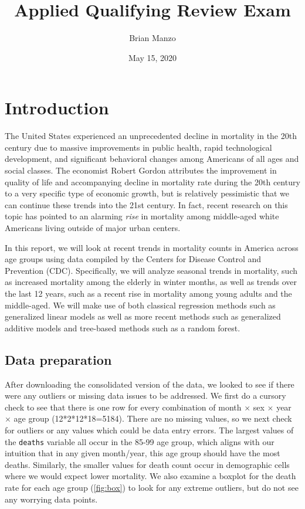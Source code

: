 \documentclass[11pt]{article}
\title{Applied Qualifying Review Exam}
\author{Brian Manzo}
\date{May 15, 2020}
\begin{document}
\maketitle


\section{Introduction}\label{sec:intro}

The United States experienced an unprecedented decline in mortality in the 20th century due to massive improvements in public health, rapid technological development, and significant behavioral changes among Americans of all ages and social classes\cite{penn2016}.
The economist Robert Gordon attributes the improvement in quality of life and accompanying decline in mortality rate during the 20th century to a very specific type of economic growth, but is relatively pessimistic that we can continue these trends into the 21st century\cite{gordon2016}.
In fact, recent research on this topic has pointed to an alarming \textit{rise} in mortality among middle-aged white Americans living outside of major urban centers\cite{case2015}.

In this report, we will look at recent trends in mortality counts in America across age groups using data compiled by the Centers for Disease Control and Prevention (CDC)\cite{cdc}.
Specifically, we will analyze seasonal trends in mortality, such as increased mortality among the elderly in winter months, as well as trends over the last 12 years, such as a recent rise in mortality among young adults and the middle-aged.
We will make use of both classical regression methods such as generalized linear models as well as more recent methods such as generalized additive models and tree-based methods such as a random forest.

\subsection{Data preparation}\label{sec:data}

After downloading the consolidated version of the data, we looked to see if there were any outliers or missing data issues to be addressed. 
We first do a cursory check to see that there is one row for every combination of month $\times$ sex $\times$ year $\times$ age group (12*2*12*18=5184). 
There are no missing values, so we next check for outliers or any values which could be data entry errors.
The largest values of the \verb+deaths+ variable all occur in the 85-99 age group, which aligns with our intuition that in any given month/year, this age group should have the most deaths.
Similarly, the smaller values for death count occur in demographic cells where we would expect lower mortality.
We also examine a boxplot for the death rate for each age group (\cref{fig:box}) to look for any extreme outliers, but do not see any worrying data points.
\end{document}
